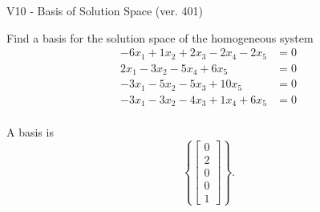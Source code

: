 \begin{exercise}
  \begin{exerciseTitle}V10 - Basis of Solution Space (ver. 401)\end{exerciseTitle}
  \begin{exerciseStatement}
    Find a basis for the solution space of the homogeneous system 
\begin{align*}
 -6 x_ 1 + 1 x_ 2 + 2 x_ 3 -2 x_ 4 -2 x_ 5 &= 0  \\ 
  2 x_ 1 -3 x_ 2 -5 x_ 4 + 6 x_ 5 &= 0  \\ 
  -3 x_ 1 -5 x_ 2 -5 x_ 3 + 10 x_ 5 &= 0  \\ 
  -3 x_ 1 -3 x_ 2 -4 x_ 3 + 1 x_ 4 + 6 x_ 5 &= 0  \\ 
 \end{align*}


 
  \end{exerciseStatement}

  \begin{exerciseAnswer}
   A basis is   
\[\left\{\left[\begin{array}{c}
0 \\
2 \\
0 \\
0 \\
1
\end{array}\right]\right\}.\]

  


  \end{exerciseAnswer}
\end{exercise}